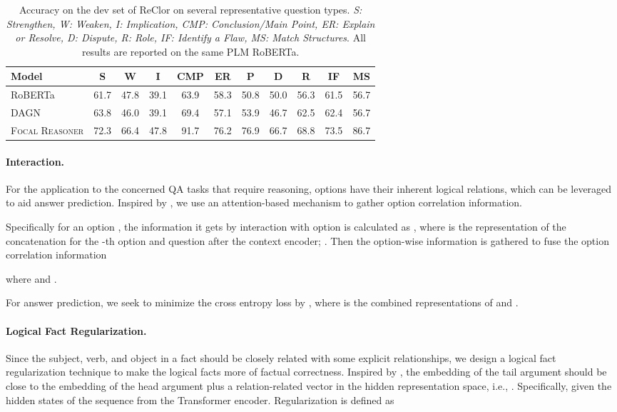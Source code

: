 \documentclass[11pt]{article}
\begin{document}
\begin{table*}[htb]
\vspace{-3mm}
\small
\setlength{\belowcaptionskip}{8.3pt}

\centering\centering\setlength{\tabcolsep}{10.3pt}
\begin{tabular}{lcccccccccc}
\toprule
Model  & S & W & I & CMP  & ER & P & D& R & IF &MS \\ 
\midrule
RoBERTa&61.7& 47.8  & 39.1 & 63.9  & 58.3 & 50.8 & 50.0 & 56.3 & 61.5 & 56.7\\
DAGN  & 63.8 & 46.0 & 39.1 & 69.4 & 57.1 & 53.9 & 46.7  & 62.5 & 62.4 & 56.7\\
\midrule
\textsc{Focal Reasoner} &72.3&66.4  & 47.8 & 91.7  & 76.2 & 76.9 & 66.7  & 68.8 & 73.5  & 86.7\\
\bottomrule
\end{tabular}
\caption{Accuracy on the dev set of ReClor on several representative question types. \textit{S: Strengthen, W: Weaken, I: Implication, CMP: Conclusion/Main Point, ER: Explain or Resolve, D: Dispute, R: Role, IF: Identify a Flaw, MS: Match Structures}. All results are reported on the same PLM RoBERTa.}\label{class}
\vspace{-3mm}
\end{table*}

\paragraph{Interaction.} For the application to the concerned QA tasks that require reasoning, options have their inherent logical relations, which can be leveraged to aid answer prediction. Inspired by \citep{ran2019option}, we use an attention-based mechanism to gather option correlation information. 

Specifically for an option , the information it gets by interaction with option  is calculated as
    ,
where  is the representation of the concatenation for the -th option and question after the context encoder; . Then the option-wise information is gathered to fuse the option correlation information

where  and . 

For answer prediction, we seek to minimize the cross entropy loss by , where  is the combined representations of  and . 

\paragraph{Logical Fact Regularization.}Since the subject, verb, and object in a fact should be closely related with some explicit relationships, we design a logical fact regularization technique to make the logical facts more of factual correctness.
Inspired by \cite{NIPS2013_1cecc7a7}, the embedding of the tail argument should be close to the embedding of the head argument plus a relation-related vector in the hidden representation space, i.e.,
. Specifically, given the hidden states of the sequence  from the Transformer encoder. Regularization is defined as
\end{document}
